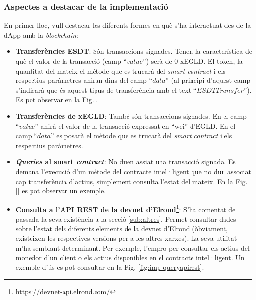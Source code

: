 \documentclass[11pt,a4paper]{article}
\begin{document}
\subsubsection{Aspectes a destacar de la implementació}\label{imp:aspectes}
En primer lloc, vull destacar les diferents formes en què s'ha interactuat des de la dApp amb la \textit{blockchain}:
\begin{itemize}
\item \textbf{Transferències ESDT}: Són transaccions signades. Tenen la característica de què el valor de la transacció (camp ``\(value\)'') serà de 0 xEGLD. El token, la quantitat del mateix el mètode que es trucarà del \textit{smart contract} i els respectius paràmetres aniran dins del camp ``\(data\)'' (al principi d'aquest camp s'indicarà que és aquest tipus de transferència amb el text ``\(ESDTTransfer\)''). Es pot observar en la Fig. \label{fig:impesdttransfer}.
\item \textbf{Transferències de xEGLD}: També són transaccions signades. En el camp ``\(value\)'' anirà el valor de la transacció expressat en ``wei'' d'EGLD. En el camp ``\(data\)'' es posarà el mètode que es trucarà del \textit{smart contract} i els respectius paràmetres.
\item \textbf{\textit{Queries} al smart \textit{contract}}: No duen assiat una transacció signada. Es demana l'execució d'un mètode del contracte intel·ligent que no duu associat cap transferència d'actius, simplement consulta l'estat del mateix. En la Fig. \ref{} es pot observar un exemple.
\item \textbf{Consulta a l'API REST de la devnet d'Elrond}\footnote{\url{https://devnet-api.elrond.com/}}: S'ha comentat de passada la seva existència a la secció \ref{sub:altres}. Permet consultar dades sobre l'estat dels diferents elements de la devnet d'Elrond (òbviament, existeixen les respectives versions per a les altres xarxes). La seva utilitat m'ha semblant determinant. Per exemple, l'empro per consultar els actius del monedor d'un client o els actius disponibles en el contracte intel·ligent. Un exemple d'ús es pot consultar en la Fig. \ref{fig:imp-queryapirest}. 
\end{itemize}
\end{document}
